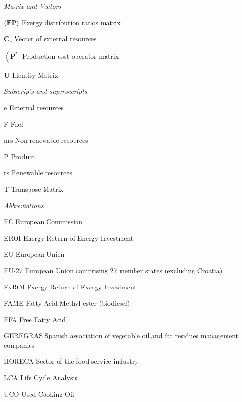 \documentclass[sustainability,article,submit,moreauthors,pdftex,12pt,a4paper]{mdpi}
\newcommand{\mopcr}[1]{\ensuremath{\left\langle {\textbf{#1}^\ast } \right|}}
\newcommand{\mbr}[1]{\ensuremath{\langle \textbf{#1} \rangle}}
\newcommand{\vm}[1]{\ensuremath{\mathbf{#1}}}
\begin{document}
\noindent\emph{Matrix and Vectors}
\begin{list}{}{
\renewcommand*{\makelabel}[1]{\hspace{\labelsep}\raggedleft #1}  
    \setlength{\labelwidth}{3em}
    \setlength{\leftmargin}{\labelwidth}
    \setlength{\parsep}{0pt}
    \setlength{\itemsep}{0pt}
    \sloppy}
    \item[\mbr{FP}] Exergy distribution ratios matrix
    \item[$\vm{C}_e$] Vector of external resources
    \item[\mopcr{P}] Production cost operator matrix
    \item[\vm{U}] Identity Matrix
\end{list}

\noindent\emph{Subscripts and supersccripts}
\begin{list}{}{
    \renewcommand*{\makelabel}[1]{\hspace{\labelsep}\raggedleft #1}  
    \setlength{\labelwidth}{3em}
    \setlength{\leftmargin}{\labelwidth}
    \setlength{\parsep}{0pt}
    \setlength{\itemsep}{0pt}
    \sloppy}
    \item[e] External resources
    \item[F] Fuel
    \item[nrs] Non renewable resources
    \item[P] Product
    \item[rs] Renewable resources
    \item[T] Transpose Matrix
\end{list}

\noindent\emph{Abbreviations}
\begin{list}{}{
	\renewcommand*{\makelabel}[1]{\hspace{\labelsep}\raggedleft #1}
    \setlength{\labelwidth}{6em}
    \setlength{\leftmargin}{\labelwidth}
    \setlength{\parsep}{0pt}
    \setlength{\itemsep}{0pt}
    \sloppy}
    \item[EC] European Commission
    \item[EROI] Energy Return of Energy Investment
    \item[EU] European Union
    \item[EU-27] European Union comprising 27 member states (excluding Croatia)
    \item[ExROI] Exergy Return of Exergy Investment
    \item[FAME] Fatty Acid Methyl ester (biodiesel)
    \item[FFA] Free Fatty Acid
    \item[GEREGRAS] Spanish association of vegetable oil and fat residues management companies
    \item[HORECA] Sector of the food service industry
    \item[LCA] Life Cycle Analysis
    \item[UCO] Used Cooking Oil
\end{list}
\end{document}
